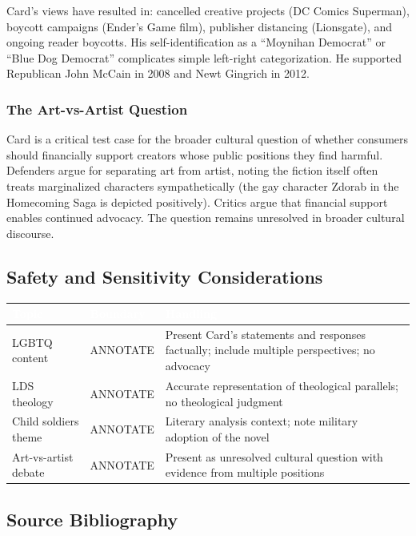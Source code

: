 \documentclass[11pt,letterpaper]{article}
\newcommand{\tableheader}[1]{\textbf{\sffamily\textcolor{white}{#1}}}
\begin{document}
Card's views have resulted in: cancelled creative projects (DC Comics Superman), boycott campaigns (Ender's Game film), publisher distancing (Lionsgate), and ongoing reader boycotts. His self-identification as a ``Moynihan Democrat'' or ``Blue Dog Democrat'' complicates simple left-right categorization. He supported Republican John McCain in 2008 and Newt Gingrich in 2012.

\subsubsection{The Art-vs-Artist Question}

Card is a critical test case for the broader cultural question of whether consumers should financially support creators whose public positions they find harmful. Defenders argue for separating art from artist, noting the fiction itself often treats marginalized characters sympathetically (the gay character Zdorab in the Homecoming Saga is depicted positively). Critics argue that financial support enables continued advocacy. The question remains unresolved in broader cultural discourse.

\subsection{Safety and Sensitivity Considerations}

\begin{center}
\begin{tabularx}{\textwidth}{L{3.5cm}L{2cm}X}
\toprule
{}
\tableheader{Topic} & \tableheader{Boundary} & \tableheader{Handling} \\
\midrule
LGBTQ content & ANNOTATE & Present Card's statements and responses factually; include multiple perspectives; no advocacy \\
LDS theology & ANNOTATE & Accurate representation of theological parallels; no theological judgment \\
Child soldiers theme & ANNOTATE & Literary analysis context; note military adoption of the novel \\
Art-vs-artist debate & ANNOTATE & Present as unresolved cultural question with evidence from multiple positions \\
\bottomrule
\end{tabularx}
\end{center}

\subsection{Source Bibliography}
\end{document}
